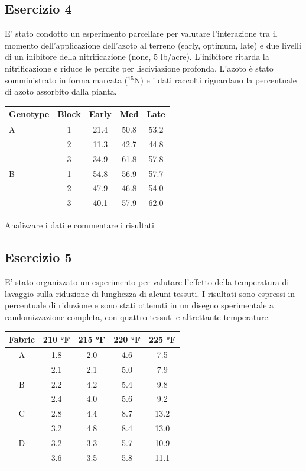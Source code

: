 \documentclass[a4paper,12pt,oneside]{book}
\begin{document}
\hypertarget{esercizio-4-6}{%
\subsection{Esercizio 4}\label{esercizio-4-6}}

E' stato condotto un esperimento parcellare per valutare l'interazione tra il momento dell'applicazione dell'azoto al terreno (early, optimum, late) e due livelli di un inibitore della nitrificazione (none, 5 lb/acre). L'inibitore ritarda la nitrificazione e riduce le perdite per lisciviazione profonda. L'azoto è stato somministrato in forma marcata (\(^{15}\)N) e i dati raccolti riguardano la percentuale di azoto assorbito dalla pianta.

\begin{longtable}[]{@{}lcccc@{}}
\toprule
Genotype & Block & Early & Med & Late \\
\midrule
\endhead
A & 1 & 21.4 & 50.8 & 53.2 \\
& 2 & 11.3 & 42.7 & 44.8 \\
& 3 & 34.9 & 61.8 & 57.8 \\
B & 1 & 54.8 & 56.9 & 57.7 \\
& 2 & 47.9 & 46.8 & 54.0 \\
& 3 & 40.1 & 57.9 & 62.0 \\
\bottomrule
\end{longtable}

Analizzare i dati e commentare i risultati

\hypertarget{esercizio-5-5}{%
\subsection{Esercizio 5}\label{esercizio-5-5}}

E' stato organizzato un esperimento per valutare l'effetto della temperatura di lavaggio sulla riduzione di lunghezza di alcuni tessuti. I risultati sono espressi in percentuale di riduzione e sono stati ottenuti in un disegno sperimentale a randomizzazione completa, con quattro tessuti e altrettante temperature.

\begin{longtable}[]{@{}ccccc@{}}
\toprule
Fabric & 210 °F & 215 °F & 220 °F & 225 °F \\
\midrule
\endhead
A & 1.8 & 2.0 & 4.6 & 7.5 \\
& 2.1 & 2.1 & 5.0 & 7.9 \\
B & 2.2 & 4.2 & 5.4 & 9.8 \\
& 2.4 & 4.0 & 5.6 & 9.2 \\
C & 2.8 & 4.4 & 8.7 & 13.2 \\
& 3.2 & 4.8 & 8.4 & 13.0 \\
D & 3.2 & 3.3 & 5.7 & 10.9 \\
& 3.6 & 3.5 & 5.8 & 11.1 \\
\bottomrule
\end{longtable}
\end{document}
